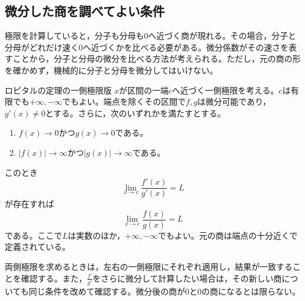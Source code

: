 \subsection{微分した商を調べてよい条件}

極限を計算していると，分子も分母も$0$へ近づく商が現れる。その場合，分子と分母がどれだけ速く$0$へ近づくかを比べる必要がある。微分係数がその速さを表すことから，分子と分母の微分を比べる方法が考えられる。ただし，元の商の形を確かめず，機械的に分子と分母を微分してはいけない。

\begin{theorem}{ロピタルの定理の一側極限版}
$x$が区間の一端$c$へ近づく一側極限を考える。$c$は有限でも$+\infty,-\infty$でもよい。端点を除くその区間で$f,g$は微分可能であり，$g'(x)\ne0$とする。さらに，次のいずれかを満たすとする。
\begin{enumerate}[label=(\roman*),leftmargin=*]
 \item $f(x)\to0$かつ$g(x)\to0$である。
 \item $|f(x)|\to\infty$かつ$|g(x)|\to\infty$である。
\end{enumerate}
このとき
\[
 \lim_{x\to c}\frac{f'(x)}{g'(x)}=L
\]
が存在すれば
\[
 \lim_{x\to c}\frac{f(x)}{g(x)}=L
\]
である。ここで$L$は実数のほか，$+\infty,-\infty$でもよい。元の商は端点の十分近くで定義されている。
\end{theorem}

両側極限を求めるときは，左右の一側極限にそれぞれ適用し，結果が一致することを確認する。また，$\frac{f'}{g'}$をさらに微分して計算したい場合は，その新しい商についても同じ条件を改めて確認する。微分後の商が$0$と$0$の商になるとは限らない。

